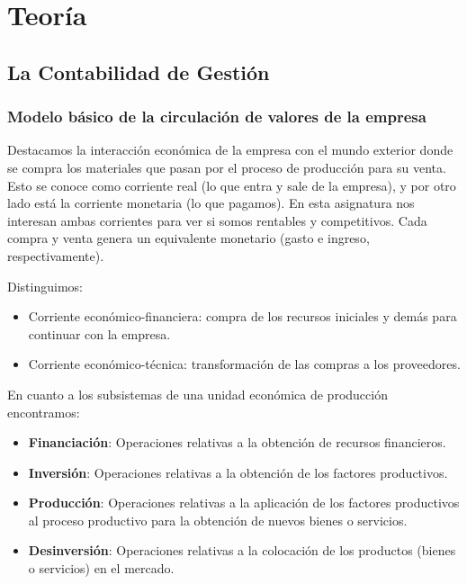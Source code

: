 \documentclass[12pt]{book} %
\providecommand{\tightlist}{%
  \setlength{\itemsep}{0pt}\setlength{\parskip}{0pt}}
\begin{document}
\part{Teoría}

\hypertarget{la-contabilidad-de-gestiuxf3n}{%
\chapter{La Contabilidad de
Gestión}\label{la-contabilidad-de-gestiuxf3n}}

\hypertarget{modelo-buxe1sico-de-la-circulaciuxf3n-de-valores-de-la-empresa}{%
\section{Modelo básico de la circulación de valores de la
empresa}\label{modelo-buxe1sico-de-la-circulaciuxf3n-de-valores-de-la-empresa}}

Destacamos la interacción económica de la empresa con el mundo exterior
donde se compra los materiales que pasan por el proceso de producción
para su venta. Esto se conoce como corriente real (lo que entra y sale
de la empresa), y por otro lado está la corriente monetaria (lo que
pagamos). En esta asignatura nos interesan ambas corrientes para ver si
somos rentables y competitivos. Cada compra y venta genera un
equivalente monetario (gasto e ingreso, respectivamente).

Distinguimos:

\begin{itemize}
\tightlist
\item
  Corriente económico-financiera: compra de los recursos iniciales y
  demás para continuar con la empresa.
\item
  Corriente económico-técnica: transformación de las compras a los
  proveedores.
\end{itemize}

En cuanto a los subsistemas de una unidad económica de producción
encontramos:

\begin{itemize}
\tightlist
\item
  \textbf{Financiación}: Operaciones relativas a la obtención de
  recursos financieros.
\item
  \textbf{Inversión}: Operaciones relativas a la obtención de los
  factores productivos.
\item
  \textbf{Producción}: Operaciones relativas a la aplicación de los
  factores productivos al proceso productivo para la obtención de nuevos
  bienes o servicios.
\item
  \textbf{Desinversión}: Operaciones relativas a la colocación de los
  productos (bienes o servicios) en el mercado.
\end{itemize}
\end{document}
